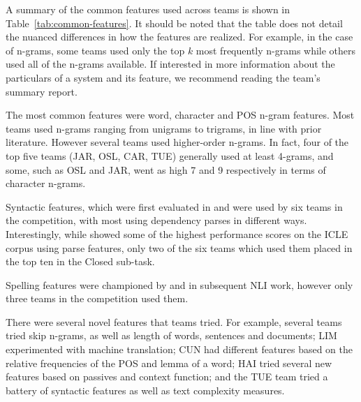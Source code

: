 \documentclass[11pt,letterpaper]{article}
\begin{document}
A summary of the common features used across teams is shown in Table~\ref{tab:common-features}.  It should be noted that the table does not detail the nuanced differences in
how the features are realized.  For example, in the case of n-grams, some teams
used only the top $k$ most frequently n-grams while others used all of the n-grams
available.  If interested in more information about the particulars of a system
and its feature, we recommend reading the team's summary report.

The most common features were word, character and POS n-gram
features.  Most teams used n-grams ranging from unigrams to trigrams, in line with
prior literature.  However several teams used higher-order n-grams.  In fact, four
of the top five teams (JAR, OSL, CAR, TUE) generally used at least 4-grams, and some,
such as OSL and JAR, went as high 7 and 9 respectively in terms of character n-grams.

Syntactic features, which were first evaluated in  and  were used
by six teams in the competition, with most using dependency parses in different ways.
Interestingly, while  showed some of the
highest performance scores on the ICLE corpus using parse features, only two of the six
teams which used them placed in the top ten in the Closed sub-task.

Spelling features were championed by 
and in subsequent NLI work, however only three teams in the competition used them.

There were several novel features that teams tried.  For example,
several teams tried skip n-grams, as well as length of words, sentences
and documents; LIM
experimented with machine translation; CUN had different features
based on the relative frequencies of the POS and lemma of a word;
HAI tried several new features based on passives and context function;
and the TUE team tried a battery of syntactic features as well as
text complexity measures.
\end{document}
